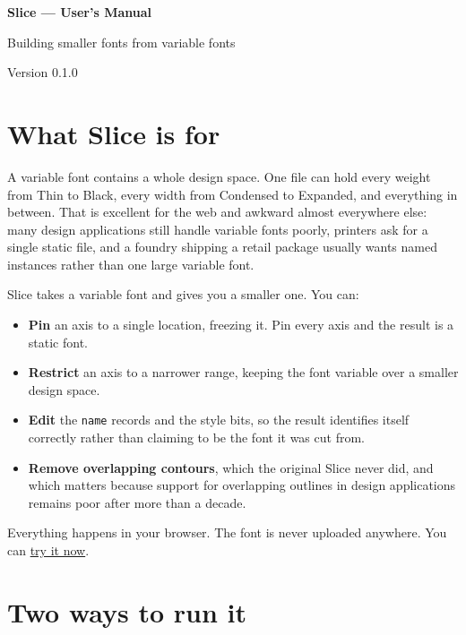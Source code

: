 \documentclass[11pt,a4paper]{article}
\begin{document}
\begin{titlepage}
\centering
\vspace*{5cm}
{\Huge\bfseries Slice — User's Manual\par}
\vspace{1cm}
{\Large Building smaller fonts from variable fonts\par}
\vspace{2cm}
{\large Version 0.1.0\par}
\vfill
\end{titlepage}
\tableofcontents
\newpage
\section{What Slice is for}

A variable font contains a whole design space. One file can hold every weight from Thin to Black, every width from Condensed to Expanded, and everything in between. That is excellent for the web and awkward almost everywhere else: many design applications still handle variable fonts poorly, printers ask for a single static file, and a foundry shipping a retail package usually wants named instances rather than one large variable font.

Slice takes a variable font and gives you a smaller one. You can:

\begin{itemize}
  \item \textbf{Pin} an axis to a single location, freezing it. Pin every axis and the result is a static font.
  \item \textbf{Restrict} an axis to a narrower range, keeping the font variable over a smaller design space.
  \item \textbf{Edit} the \texttt{name} records and the style bits, so the result identifies itself correctly rather than claiming to be the font it was cut from.
  \item \textbf{Remove overlapping contours}, which the original Slice never did, and which matters because support for overlapping outlines in design applications remains poor after more than a decade.
\end{itemize}

Everything happens in your browser. The font is never uploaded anywhere. You can \href{https://felipesanches.github.io/slice-web/app/}{try it now}.

\section{Two ways to run it}
\end{document}
